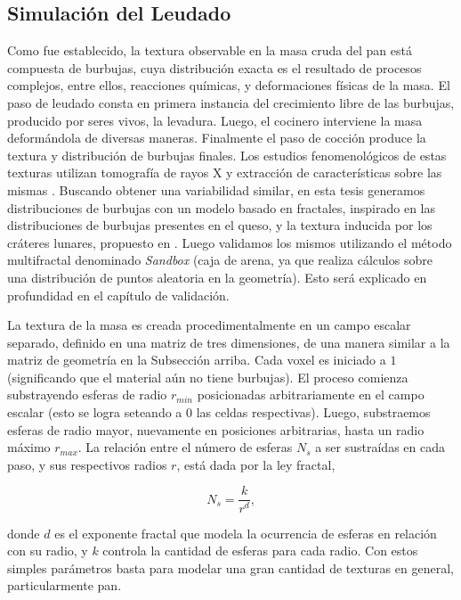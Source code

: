 \subsection{Simulación del Leudado}
\label{breadprov}
Como fue establecido, la textura observable en la masa cruda del pan está compuesta de burbujas, cuya distribución exacta es el resultado de procesos complejos, entre ellos, reacciones químicas, y deformaciones físicas de la masa.
El paso de leudado consta en primera instancia del crecimiento libre de las burbujas, producido por seres vivos, la levadura.
Luego, el cocinero interviene la masa deformándola de diversas maneras.
Finalmente el paso de cocción produce la textura y distribución de burbujas finales.
Los estudios fenomenológicos de estas texturas utilizan tomografía de rayos X y extracción de características sobre las mismas \cite{Gonzales2008,Babin2006,VanDyck2014}.
Buscando obtener una variabilidad similar, en esta tesis generamos distribuciones de burbujas con un modelo basado en fractales, inspirado en las distribuciones de burbujas presentes en el queso, y la textura inducida por los cráteres lunares, propuesto en \cite{Mandelbrot1983}.
Luego validamos los mismos utilizando el método multifractal denominado {\em Sandbox} (caja de arena, ya que realiza cálculos sobre una distribución de puntos aleatoria en la geometría).
Esto será explicado en profundidad en el capítulo de validación.

La textura de la masa es creada procedimentalmente en un campo escalar separado, definido en una matriz de tres dimensiones, de una manera similar a la matriz de geometría en la Subsección arriba.
Cada voxel es iniciado a $1$ (significando que el material aún no tiene burbujas).
El proceso comienza substrayendo esferas de radio $r_{min}$ posicionadas arbitrariamente en el campo escalar (esto se logra seteando a $0$ las celdas respectivas).
Luego, substraemos esferas de radio mayor, nuevamente en posiciones arbitrarias, hasta un radio máximo $r_{max}$.
La relación entre el número de esferas $N_{s}$ a ser sustraídas en cada paso, y sus respectivos radios $r$, está dada por la ley fractal,


\begin{equation*}
N_{s} = \frac{k}{r^{d}},
\end{equation*}

donde $d$ es el exponente fractal que modela la ocurrencia de esferas en relación con su radio, y $k$ controla la cantidad de esferas para cada radio.
Con estos simples parámetros basta para modelar una gran cantidad de texturas en general, particularmente pan.

